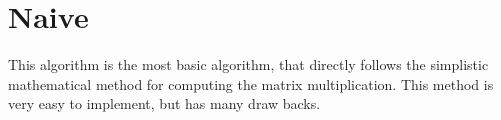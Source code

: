 \documentclass[../main.tex]{subfiles}
\begin{document}
\section{Naive}%
\label{sec:naive}

This algorithm is the most basic algorithm, that directly follows the
simplistic mathematical method for computing the matrix multiplication. This
method is very easy to implement, but has many draw backs.
\end{document}
